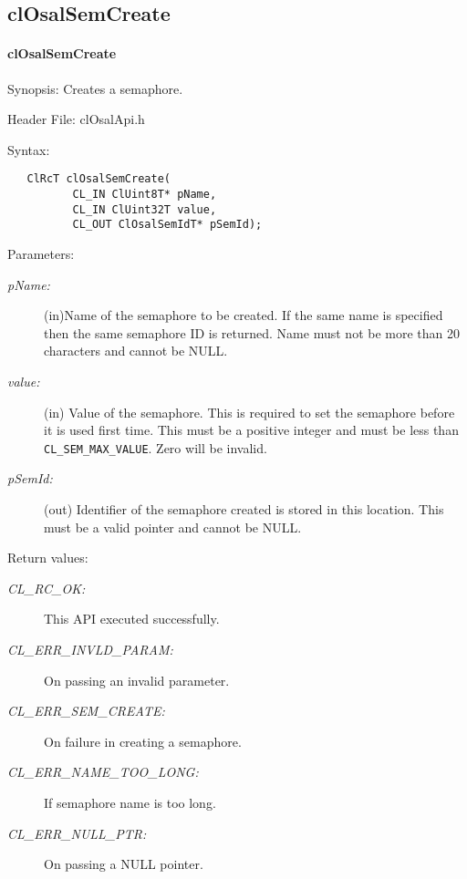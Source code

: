 \newpage
\subsection{clOsalSemCreate}
\hypertarget{pageosal132}{}\paragraph{cl\-Osal\-Sem\-Create}\label{pageosal132}
\begin{Desc}
\item[Synopsis:]Creates a semaphore.\end{Desc}
\begin{Desc}
\item[Header File:]clOsalApi.h\end{Desc}
\begin{Desc}
\item[Syntax:]

\footnotesize\begin{verbatim}   ClRcT clOsalSemCreate(
          CL_IN ClUint8T* pName,
          CL_IN ClUint32T value,
          CL_OUT ClOsalSemIdT* pSemId);
\end{verbatim}
\normalsize
\end{Desc}
\begin{Desc}
\item[Parameters:]
\begin{description}
\item[{\em p\-Name:}](in)Name of the semaphore to be created. If the same name is specified then the same semaphore ID is returned. Name must not be
more than 20 characters and cannot be NULL.\item[{\em value:}](in) Value of the semaphore. This is required to set the semaphore before it is used first 
time. This must be a positive integer and must be less than {\tt CL\_\-SEM\_\-MAX\_\-VALUE}. Zero will be invalid.\item[{\em p\-Sem\-Id:}](out) Identifier of the semaphore created is stored in this location. This must be a valid pointer and cannot be NULL.\end{description}
\end{Desc}
\begin{Desc}
\item[Return values:]
\begin{description}
\item[{\em CL\_\-RC\_\-OK:}]This API executed successfully. \item[{\em CL\_\-ERR\_\-INVLD\_\-PARAM:}]On passing an invalid parameter. \item[{\em CL\_\-ERR\_\-SEM\_\-CREATE:}]On failure in creating a semaphore. \item[{\em CL\_\-ERR\_\-NAME\_\-TOO\_\-LONG:}]If semaphore name is too long. \item[{\em CL\_\-ERR\_\-NULL\_\-PTR:}]On passing a NULL pointer.\end{description}
\end{Desc}

